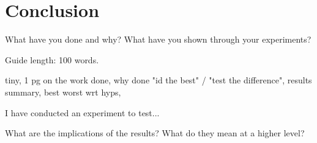 \documentclass{csfourzero}
\begin{document}
\section{Conclusion}
\label{sec:conc}

What have you done and why? What have you shown through your
experiments?

Guide length: 100 words.

tiny, 1 pg on the work done, why done "id the best" / "test the difference", results summary, best worst wrt hyps,

I have conducted an experiment to test...

What are the implications of the results? What do they mean at a higher level?


\end{document}
